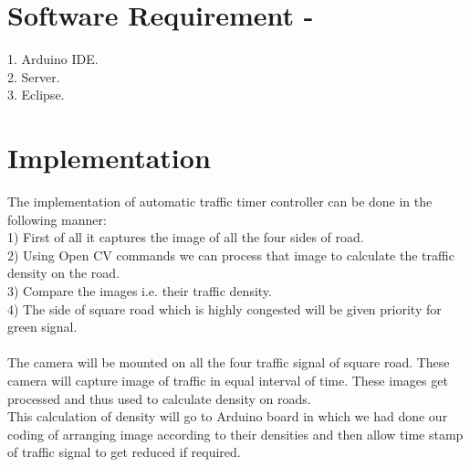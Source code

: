 \documentclass[]{article}
\begin{document}
\section*{Software Requirement - }
1. Arduino IDE.
\\
2. Server.
\\
3. Eclipse.


\section*{Implementation}
The implementation of automatic traffic timer controller can be done in the following manner:
\\
1) First of all it captures the image of all the four sides of road.
\\
2) Using Open CV commands we can process that image to calculate the traffic density on the road.
\\
3) Compare the images i.e. their traffic density.
\\
4) The side of square road which is highly congested will be given priority for green signal.
\\
\\
The camera will be mounted on all the four traffic signal of square road. These camera will capture image of traffic in equal interval of time. These images get processed and thus used to calculate density on roads. 
\\
This calculation of density will go to Arduino board in which we had done our coding of arranging image according to their densities and then allow time stamp of traffic signal to get reduced if required.
\end{document}
